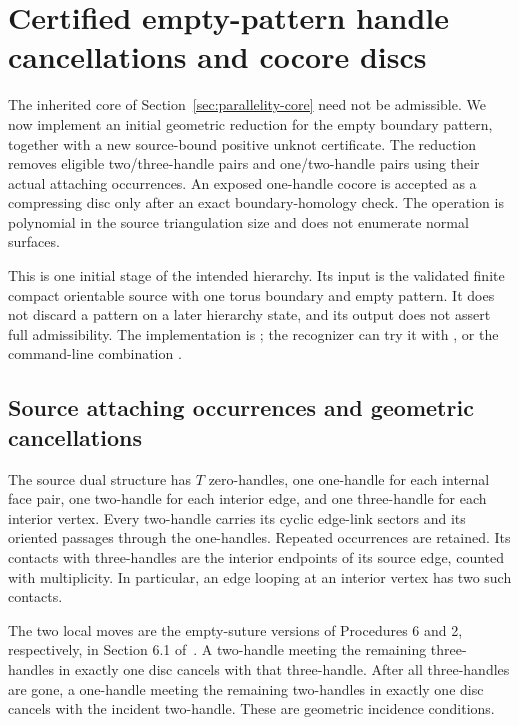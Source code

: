\section{Certified empty-pattern handle cancellations and cocore discs}
\label{sec:source-handles}

The inherited core of Section~\ref{sec:parallelity-core} need not be
admissible. We now implement an initial geometric reduction for the empty
boundary pattern, together with a new source-bound positive unknot
certificate. The reduction removes eligible two/three-handle pairs and
one/two-handle pairs using their actual attaching occurrences. An exposed
one-handle cocore is accepted as a compressing disc only after an exact
boundary-homology check. The operation is polynomial in the source
triangulation size and does not enumerate normal surfaces.

This is one initial stage of the intended hierarchy. Its input is the
validated finite compact orientable source with one torus boundary and
empty pattern. It does not discard a pattern on a later hierarchy state,
and its output does not assert full admissibility. The implementation is
; the recognizer can try it with
, or the command-line combination
.

\subsection{Source attaching occurrences and geometric cancellations}

The source dual structure has $T$ zero-handles, one one-handle for each
internal face pair, one two-handle for each interior edge, and one
three-handle for each interior vertex. Every two-handle carries its cyclic
edge-link sectors and its oriented passages through the one-handles.
Repeated occurrences are retained. Its contacts with three-handles are the
interior endpoints of its source edge, counted with multiplicity. In
particular, an edge looping at an interior vertex has two such contacts.

The two local moves are the empty-suture versions of Procedures 6 and 2,
respectively, in Section 6.1 of~\cite{lackenby-parallelity}. A two-handle
meeting the remaining three-handles in exactly one disc cancels with that
three-handle. After all three-handles are gone, a one-handle meeting the
remaining two-handles in exactly one disc cancels with the incident
two-handle. These are geometric incidence conditions.

